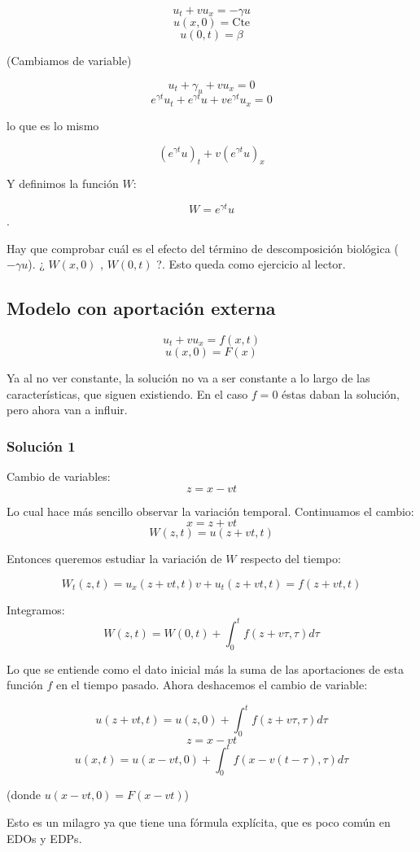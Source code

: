 \documentclass[palatino]{apuntes}
\begin{document}
$$u_t + vu_x = -\gamma u$$
$$u(x,0) = \text{Cte}$$
$$u(0,t) = \beta$$

(Cambiamos de variable)

$$u_t + \gamma_u + vu_x = 0$$
$$e^{\gamma t} u_t + e^{\gamma t} u + v e^{ \gamma t} u_x = 0 $$

lo que es lo mismo

$$(e^{\gamma t}u)_t + v (e^{\gamma t} u)_x$$

Y definimos la función $W$:

$$W = e^{\gamma t}u$$.


Hay que comprobar cuál es el efecto del término de descomposición biológica ($-\gamma u$). ¿ $W(x,0)$ , $ W(0,t)$ ?. Esto queda como ejercicio al lector.


\subsection{Modelo con aportación externa}

$$u_t + vu_x = f(x,t)$$
$$u(x,0) = F(x)$$

Ya al no ver constante, la solución no va a ser constante a lo largo de las características, que siguen existiendo. En el caso $f = 0$ éstas daban la solución, pero ahora van a influir.

\subsubsection{Solución 1}

Cambio de variables:
$$z = x-vt$$

Lo cual hace más sencillo observar la variación temporal. Continuamos el cambio:
$$x = z + vt$$
$$W(z,t) = u(z+vt, t)$$

Entonces queremos estudiar la variación de $W$ respecto del tiempo:

$$W_t(z,t) = u_x(z + vt, t)v + u_t(z+vt, t) = f(z + vt, t)$$

Integramos:
$$W(z,t) = W(0,t) + \int^{t}_{0} f(z+v\tau, \tau) d\tau $$

Lo que se entiende como el dato inicial más la suma de las aportaciones de esta función $f$ en el tiempo pasado. Ahora deshacemos el cambio de variable:

$$u(z + vt, t) = u(z,0) + \int^{t}_{0} f(z+v\tau, \tau) d\tau$$
$$z = x-vt$$
$$u(x,t) = u(x-vt,0)+ \int^{t}_{0} f(x-v(t-\tau),\tau) d\tau$$

(donde $u(x-vt,0) = F(x-vt)$)

Esto es un milagro ya que tiene una fórmula explícita, que es poco común en EDOs y EDPs.
\end{document}
